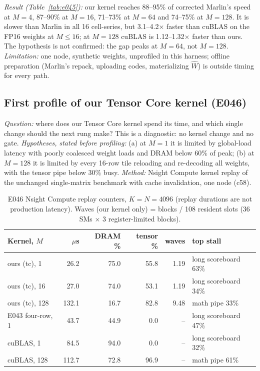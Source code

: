 \documentclass[sigconf,nonacm]{acmart}
\begin{document}
\emph{Result (Table~\ref{tab:e045}):} our kernel reaches 88--95\% of corrected Marlin's speed at $M=4$, 87--90\% at $M=16$, 71--73\% at $M=64$ and 74--75\% at $M=128$. It is slower than Marlin in all 16 cell-series, but 3.1--4.2$\times$ faster than cuBLAS on the FP16 weights at $M \le 16$; at $M=128$ cuBLAS is 1.12--1.32$\times$ faster than ours. The hypothesis is not confirmed: the gap peaks at $M=64$, not $M=128$. \emph{Limitation:} one node, synthetic weights, unprofiled in this harness; offline preparation (Marlin's repack, uploading codes, materializing $\hat W$) is outside timing for every path.

\subsection{First profile of our Tensor Core kernel (E046)}
\emph{Question:} where does our Tensor Core kernel spend its time, and which single change should the next rung make? This is a diagnostic: no kernel change and no gate. \emph{Hypotheses, stated before profiling:} (a) at $M=1$ it is limited by global-load latency with poorly coalesced weight loads and DRAM below 60\% of peak; (b) at $M=128$ it is limited by every 16-row tile reloading and re-decoding all weights, with the tensor pipe below 30\% busy. \emph{Method:} Nsight Compute kernel replay of the unchanged single-matrix benchmark with cache invalidation, one node (c58).

\begin{table}[t]
\caption{E046 Nsight Compute replay counters, $K=N=4096$ (replay durations are not production latency). Waves (our kernel only) = blocks / 108 resident slots (36 SMs $\times$ 3 register-limited blocks).}
\label{tab:e046}
\small
\setlength{\tabcolsep}{3pt}
\begin{tabular}{lrrrrl}
\toprule
Kernel, $M$ & $\mu$s & DRAM \% & tensor \% & waves & top stall \\
\midrule
ours (tc), 1 & 26.2 & 75.0 & 55.8 & 1.19 & long scoreboard 63\% \\
ours (tc), 16 & 27.0 & 74.0 & 53.1 & 1.19 & long scoreboard 34\% \\
ours (tc), 128 & 132.1 & 16.7 & 82.8 & 9.48 & math pipe 33\% \\
E043 four-row, 1 & 43.7 & 44.9 & 0.0 & -- & long scoreboard 47\% \\
cuBLAS, 1 & 84.5 & 94.0 & 0.0 & -- & long scoreboard 32\% \\
cuBLAS, 128 & 112.7 & 72.8 & 96.9 & -- & math pipe 61\% \\
\bottomrule
\end{tabular}
\end{table}
\end{document}
